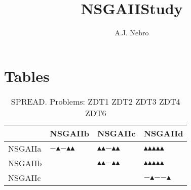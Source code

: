 \documentclass{article}
\title{NSGAIIStudy}
\author{A.J. Nebro}
\begin{document}
\maketitle
\section{Tables}

\begin{table}
\caption{SPREAD. Problems: ZDT1 ZDT2 ZDT3 ZDT4 ZDT6 }
\label{table: SPREAD}
\centering
\begin{scriptsize}
\begin{tabular}{llll}
\hline 
 &  NSGAIIb &  NSGAIIc &  NSGAIId\\
\hline 
 NSGAIIa & $-$$\blacktriangle$$-$$\blacktriangle$$\blacktriangle$ & $\blacktriangle$$\blacktriangle$$-$$\blacktriangle$$\blacktriangle$ & $\blacktriangle$$\blacktriangle$$\blacktriangle$$\blacktriangle$$\blacktriangle$\\
 NSGAIIb &  & $\blacktriangle$$\blacktriangle$$-$$\blacktriangle$$\blacktriangle$ & $\blacktriangle$$\blacktriangle$$\blacktriangle$$\blacktriangle$$\blacktriangle$\\
 NSGAIIc &  &  & $-$$\blacktriangle$$-$$-$$\blacktriangle$\\
\hline
\end{tabular}
\end{scriptsize}
\end{table}
\end{document}
